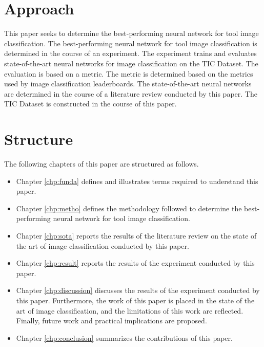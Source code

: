 \section{Approach}
This paper seeks to determine the best-performing neural network for tool image classification. The best-performing neural network for tool image classification is determined in the course of an experiment. The experiment trains and evaluates state-of-the-art neural networks for image classification on the \ac{TIC Dataset}. The evaluation is based on a metric. The metric is determined based on the metrics used by image classification leaderboards. The state-of-the-art neural networks are determined in the course of a literature review conducted by this paper. The \ac{TIC Dataset} is constructed in the course of this paper.

\section{Structure}
The following chapters of this paper are structured as follows. 
\begin{itemize}
	\item Chapter \ref{chp:funda} defines and illustrates terms required to understand this paper.
	\item Chapter \ref{chp:metho} defines the methodology followed to determine the best-performing neural network for tool image classification.
	\item Chapter \ref{chp:sota} reports the results of the literature review on the state of the art of image classification conducted by this paper.
	\item Chapter \ref{chp:result} reports the results of the experiment conducted by this paper.
	\item Chapter \ref{chp:discussion} discusses the results of the experiment conducted by this paper. Furthermore, the work of this paper is placed in the state of the art of image classification, and the limitations of this work are reflected. Finally, future work and practical implications are proposed.
	\item Chapter \ref{chp:conclusion} summarizes the contributions of this paper.
\end{itemize}